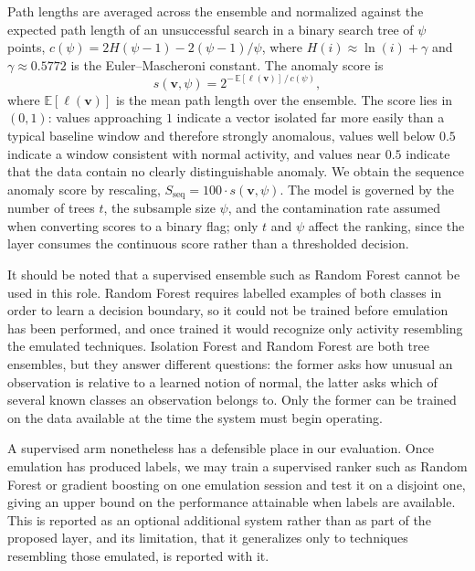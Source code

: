 \documentclass[conference]{IEEEtran}
\begin{document}
Path lengths are averaged across the ensemble and normalized against the expected path length of an unsuccessful search in a binary search tree of $\psi$ points, $c(\psi) = 2H(\psi-1) - 2(\psi-1)/\psi$, where $H(i) \approx \ln(i) + \gamma$ and $\gamma \approx 0.5772$ is the Euler--Mascheroni constant. The anomaly score is
\begin{equation}
s(\mathbf{v}, \psi) = 2^{-\,\mathbb{E}[\ell(\mathbf{v})]\,/\,c(\psi)},
\end{equation}
where $\mathbb{E}[\ell(\mathbf{v})]$ is the mean path length over the ensemble. The score lies in $(0,1)$: values approaching $1$ indicate a vector isolated far more easily than a typical baseline window and therefore strongly anomalous, values well below $0.5$ indicate a window consistent with normal activity, and values near $0.5$ indicate that the data contain no clearly distinguishable anomaly. We obtain the sequence anomaly score by rescaling, $S_\mathrm{seq} = 100 \cdot s(\mathbf{v}, \psi)$. The model is governed by the number of trees $t$, the subsample size $\psi$, and the contamination rate assumed when converting scores to a binary flag; only $t$ and $\psi$ affect the ranking, since the layer consumes the continuous score rather than a thresholded decision.

It should be noted that a supervised ensemble such as Random Forest cannot be used in this role. Random Forest requires labelled examples of both classes in order to learn a decision boundary, so it could not be trained before emulation has been performed, and once trained it would recognize only activity resembling the emulated techniques. Isolation Forest and Random Forest are both tree ensembles, but they answer different questions: the former asks how unusual an observation is relative to a learned notion of normal, the latter asks which of several known classes an observation belongs to. Only the former can be trained on the data available at the time the system must begin operating.

A supervised arm nonetheless has a defensible place in our evaluation. Once emulation has produced labels, we may train a supervised ranker such as Random Forest or gradient boosting on one emulation session and test it on a disjoint one, giving an upper bound on the performance attainable when labels are available. This is reported as an optional additional system rather than as part of the proposed layer, and its limitation, that it generalizes only to techniques resembling those emulated, is reported with it.
\end{document}
